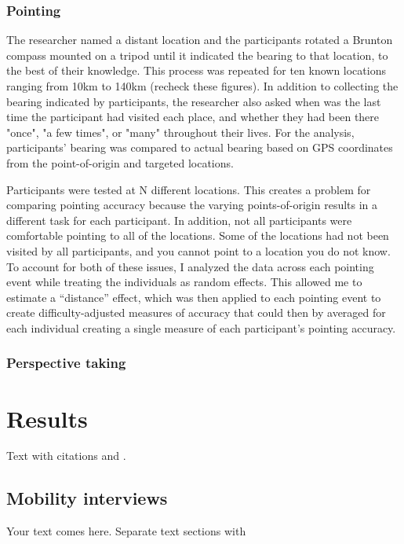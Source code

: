 		\subsubsection{Pointing}
		\label{sec:2.2.3}
The researcher named a distant location and the participants rotated a Brunton compass mounted on a tripod until it indicated the bearing to that location, to the best of their knowledge.  This process was repeated for ten known locations ranging from 10km to 140km (recheck these figures).  In addition to collecting the bearing indicated by participants, the researcher also asked when was the last time the participant had visited each place, and whether they had been there "once", "a few times", or "many" throughout their lives.  For the analysis, participants' bearing was compared to actual bearing based on GPS coordinates from the point-of-origin and targeted locations.   		

Participants were tested at N different locations.  This creates a problem for comparing pointing accuracy because the varying points-of-origin results in a different task for each participant.  In addition, not all participants were comfortable pointing to all of the locations.  Some of the locations had not been visited by all participants, and you cannot point to a location you do not know.  To account for both of these issues, I analyzed the data across each pointing event while treating the individuals as random effects.  This allowed me to estimate a ``distance'' effect, which was then applied to each pointing event to create difficulty-adjusted measures of accuracy that could then by averaged for each individual creating a single measure of each participant's pointing accuracy. 		
			
		\subsubsection{Perspective taking}
		\label{sec:2.2.4}			


\section{Results}
\label{sec:3}
Text with citations \cite{RefB} and \cite{RefJ}.
	\subsection{Mobility interviews}
	\label{sec:3.1}
Your text comes here. Separate text sections with	

